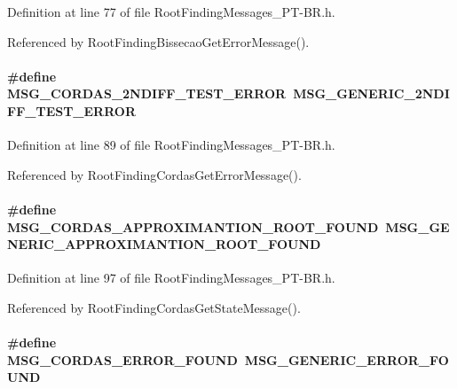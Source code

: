Definition at line 77 of file RootFindingMessages\_\-PT-BR.h.

Referenced by RootFindingBissecaoGetErrorMessage().\hypertarget{group____messages_g5c53fb596fa16a011c11b5f774fc734c}{
\paragraph[MSG\_\-CORDAS\_\-2NDIFF\_\-TEST\_\-ERROR]{\setlength{\rightskip}{0pt plus 5cm}\#define MSG\_\-CORDAS\_\-2NDIFF\_\-TEST\_\-ERROR~MSG\_\-GENERIC\_\-2NDIFF\_\-TEST\_\-ERROR}\hfill}
\label{group____messages_g5c53fb596fa16a011c11b5f774fc734c}




Definition at line 89 of file RootFindingMessages\_\-PT-BR.h.

Referenced by RootFindingCordasGetErrorMessage().\hypertarget{group____messages_g3ec8f3193397bc6bd52fa50ee40e4768}{
\paragraph[MSG\_\-CORDAS\_\-APPROXIMANTION\_\-ROOT\_\-FOUND]{\setlength{\rightskip}{0pt plus 5cm}\#define MSG\_\-CORDAS\_\-APPROXIMANTION\_\-ROOT\_\-FOUND~MSG\_\-GENERIC\_\-APPROXIMANTION\_\-ROOT\_\-FOUND}\hfill}
\label{group____messages_g3ec8f3193397bc6bd52fa50ee40e4768}




Definition at line 97 of file RootFindingMessages\_\-PT-BR.h.

Referenced by RootFindingCordasGetStateMessage().\hypertarget{group____messages_gdceb3235c5e378df5e9204c5bd9802b9}{
\paragraph[MSG\_\-CORDAS\_\-ERROR\_\-FOUND]{\setlength{\rightskip}{0pt plus 5cm}\#define MSG\_\-CORDAS\_\-ERROR\_\-FOUND~MSG\_\-GENERIC\_\-ERROR\_\-FOUND}\hfill}
\label{group____messages_gdceb3235c5e378df5e9204c5bd9802b9}




